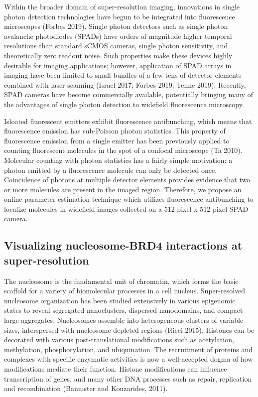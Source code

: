 \documentclass{ucetd}
\begin{document}
Within the broader domain of super-resolution imaging, innovations in single photon detection technologies have begun to be integrated into fluorescence microscopes (Forbes 2019). Single photon detectors such as single photon avalanche photodiodes (SPADs) have orders of magnitude higher temporal resolutions than standard sCMOS cameras, single photon sensitivity, and theoretically zero readout noise. Such properties make these devices highly desirable for imaging applications; however, application of SPAD arrays in imaging have been limited to small bundles of a few tens of detector elements combined with laser scanning (Israel 2017; Forbes 2019; Tenne 2019). Recently, SPAD cameras have become commercially available, potentially bringing many of the advantages of single photon detection to widefield fluorescence microscopy. 

Isloated fluorescent emitters exhibit fluorescence antibunching, which means that fluorescence emission has sub-Poisson photon statistics. This property of fluorescence emission from a single emitter has been previously applied to counting fluorescent molecules in the spot of a confocal microscope (Ta 2010). Molecular counting with photon statistics has a fairly simple motivation: a photon emitted by a fluorescence molecule can only be detected once. Coincidence of photons at multiple detector elements provides evidence that two or more molecules are present in the imaged region. Therefore, we propose an online parameter estimation technique which utilizes fluorescence antibunching to localize molecules in widefield images collected on a 512 pixel x 512 pixel SPAD camera.

\subsection{Visualizing nucleosome-BRD4 interactions at super-resolution}

The nucleosome is the fundamental unit of chromatin, which forms the basic scaffold for a variety of biomolecular processes in a cell nucleus. Super-resolved nucleosome organization has been studied extensively in various epigenomic states to reveal segregated nanoclusters, dispersed nanodomains, and compact large aggregates. Nucleosomes assemble into heterogeneous clusters of variable sizes, interspersed with nucleosome-depleted regions (Ricci 2015). Histones can be decorated with various post-translational modifications such as acetylation, methylation, phosphorylation, and ubiquination. The recruitment of proteins and complexes with specific enzymatic activities is now a well-accepted dogma of how modifications mediate their function. Histone modifications can influence transcription of genes, and many other DNA processes such as repair, replication and recombination (Bannister and Kouzarides, 2011). 
\end{document}
